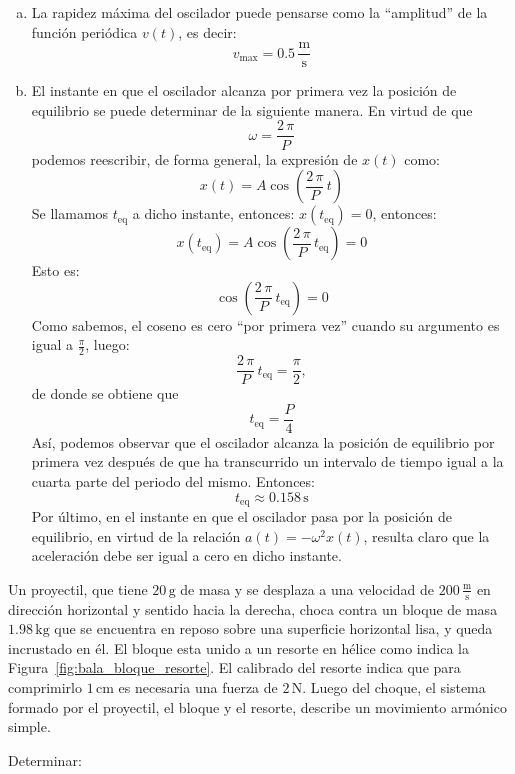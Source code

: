 \documentclass[addpoints]{exam}
\newcommand{\un}[1]{\text{#1}}
\begin{document}
\begin{questions}
\begin{solution}
\begin{enumerate}[a)]
        \item La rapidez máxima del oscilador puede pensarse como la ``amplitud'' de la función periódica $v(t)$, es decir: $$v_\text{max} = 0.5 \, \frac{\text{m}}{\text{s}}$$
        \item El instante en que el oscilador alcanza por primera vez la posición de equilibrio se puede determinar de la siguiente manera. En virtud de que $$\omega = \frac{2 \, \pi}{P}$$ podemos reescribir, de forma general, la expresión de $x(t)$ como: $$ x(t) = A \cos \left(\frac{2 \, \pi}{P} \, t\right)$$ Se llamamos $t_\text{eq}$ a dicho instante, entonces: $x(t_\text{eq}) = 0$, entonces: $$x(t_\text{eq}) = A \cos \left(\frac{2 \, \pi}{P} \, t_\text{eq}\right) = 0$$ Esto es: $$\cos \left(\frac{2 \, \pi}{P} \, t_\text{eq}\right) = 0$$ Como sabemos, el coseno es cero ``por primera vez'' cuando su argumento es igual a $\frac{\pi}{2}$, luego: $$\frac{2 \, \pi}{P} \, t_\text{eq} = \frac{\pi}{2},$$ de donde se obtiene que $$t_\text{eq} = \frac{P}{4}$$ Así, podemos observar que el oscilador alcanza la posición de equilibrio por primera vez después de que ha transcurrido un intervalo de tiempo igual a la cuarta parte del periodo del mismo. Entonces: $$t_\text{eq} \approx 0.158 \, \text{s}$$ Por último, en el instante en que el oscilador pasa por la posición de equilibrio, en virtud de la relación $a(t) = - \omega^2 x(t)$, resulta claro que la aceleración debe ser igual a cero en dicho instante.
    \end{enumerate}
    \end{solution}

    \question Un proyectil, que tiene $20 \, \un{g}$ de masa y se desplaza a una velocidad de $200 \, \frac{\text{m}}{\text{s}}$ en dirección horizontal y sentido hacia la derecha, choca contra un bloque de masa $1.98 \, \un{kg}$ que se encuentra en reposo sobre una superficie horizontal lisa, y queda incrustado en él. El bloque esta unido a un resorte en hélice como indica la Figura~\ref{fig:bala_bloque_resorte}. El calibrado del resorte indica que para comprimirlo $1 \, \un{cm}$ es necesaria una fuerza de $2 \, \un{N}$. Luego del choque, el sistema formado por el proyectil, el bloque y el resorte, describe un movimiento armónico simple.
        
    Determinar:
\end{questions}
\end{document}
